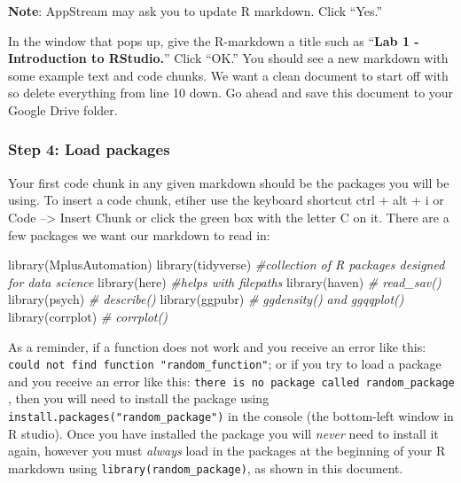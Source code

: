 \documentclass[
]{article}
\newenvironment{Shaded}{\begin{snugshade}}{\end{snugshade}}
\newcommand{\CommentTok}[1]{\textcolor[rgb]{0.56,0.35,0.01}{\textit{#1}}}
\newcommand{\FunctionTok}[1]{\textcolor[rgb]{0.00,0.00,0.00}{#1}}
\newcommand{\NormalTok}[1]{#1}
\begin{document}
\textbf{Note}: AppStream may ask you to update R markdown. Click
``Yes.''

In the window that pops up, give the R-markdown a title such as
``\textbf{Lab 1 - Introduction to RStudio.}'' Click ``OK.'' You should
see a new markdown with some example text and code chunks. We want a
clean document to start off with so delete everything from line 10 down.
Go ahead and save this document to your Google Drive folder.

\hypertarget{step-4-load-packages}{%
\subsubsection{Step 4: Load packages}\label{step-4-load-packages}}

Your first code chunk in any given markdown should be the packages you
will be using. To insert a code chunk, etiher use the keyboard shortcut
ctrl + alt + i or Code --\textgreater{} Insert Chunk or click the green
box with the letter C on it. There are a few packages we want our
markdown to read in:

\begin{Shaded}
\begin{Highlighting}[]
\FunctionTok{library}\NormalTok{(MplusAutomation)}
\FunctionTok{library}\NormalTok{(tidyverse) }\CommentTok{\#collection of R packages designed for data science}
\FunctionTok{library}\NormalTok{(here) }\CommentTok{\#helps with filepaths}
\FunctionTok{library}\NormalTok{(haven) }\CommentTok{\# read\_sav()}
\FunctionTok{library}\NormalTok{(psych) }\CommentTok{\# describe()}
\FunctionTok{library}\NormalTok{(ggpubr) }\CommentTok{\# ggdensity() and ggqqplot()}
\FunctionTok{library}\NormalTok{(corrplot) }\CommentTok{\# corrplot()}
\end{Highlighting}
\end{Shaded}

As a reminder, if a function does not work and you receive an error like
this: \texttt{could\ not\ find\ function\ "random\_function"}; or if you
try to load a package and you receive an error like this:
\texttt{there\ is\ no\ package\ called\ \textasciigrave{}random\_package\textasciigrave{}}
, then you will need to install the package using
\texttt{install.packages("random\_package")} in the console (the
bottom-left window in R studio). Once you have installed the package you
will \emph{never} need to install it again, however you must
\emph{always} load in the packages at the beginning of your R markdown
using \texttt{library(random\_package)}, as shown in this document.
\end{document}
